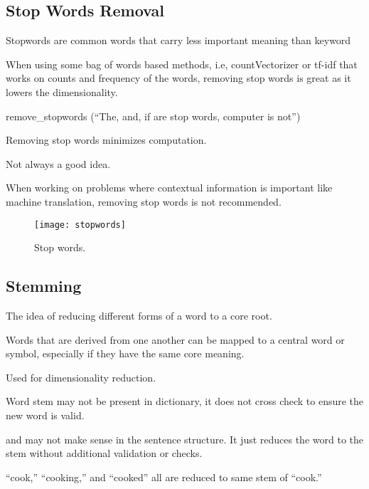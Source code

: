 	\subsection{Stop Words Removal}
	\begin{bulletedlist}
		\item Stopwords are common words that carry less important meaning than keyword
		\item When using some bag of words based methods, i.e, countVectorizer or tf-idf that works on counts and frequency of the words, removing stop words is great as it lowers the dimensionality.
		\begin{bulletedlist}
			\item remove\_stopwords (``The, and, if are stop words, computer is not'')
			\item Removing stop words minimizes computation.
		\end{bulletedlist}
		\item Not always a good idea.
		\begin{bulletedlist}
			\item When working on problems where contextual information is important like machine translation, removing stop words is not
recommended.
		\end{bulletedlist}
	\end{bulletedlist}

	\begin{figure}[htb]
		\centering
		\texttt{[image: stopwords]}
		\caption[Stop words]{Stop words.}
		\label{fig:stopwords}
	\end{figure}


	\subsection{Stemming}
	\begin{bulletedlist}
		\item The idea of reducing different forms of a word to a core root.
		\item Words that are derived from one another can be mapped to a central word or symbol, especially if they have the same
core meaning.
		\item Used for dimensionality reduction.
		\item Word stem may not be present in dictionary, it does not cross check to ensure the new word is valid.
		\item and may not make sense in the sentence structure.  It just reduces the word to the stem without additional validation or checks.
		\item ``cook,'' ``cooking,'' and ``cooked'' all are reduced to same stem of ``cook.''
	\end{bulletedlist}

